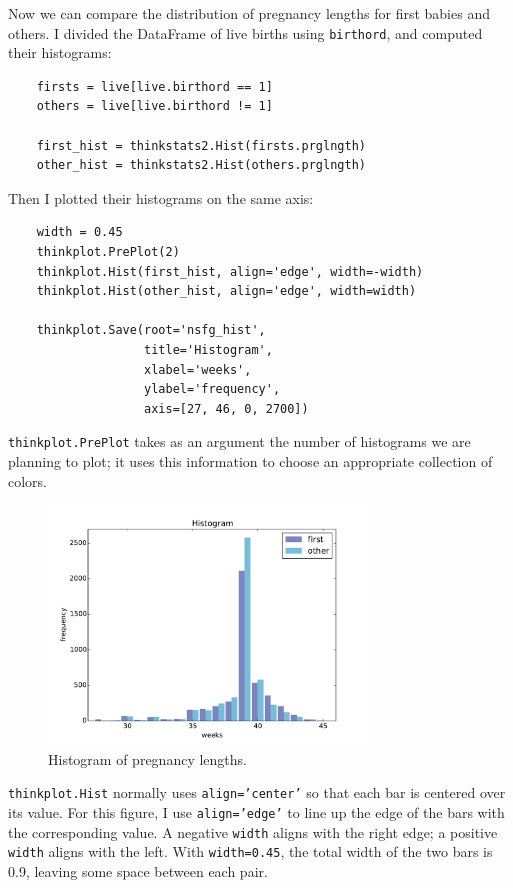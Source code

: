 \documentclass[12pt]{book}
\begin{document}
Now we can compare the distribution of pregnancy lengths for first
babies and others.  I divided the DataFrame of live births using
{\tt birthord}, and computed their histograms:

\begin{verbatim}
    firsts = live[live.birthord == 1]
    others = live[live.birthord != 1]

    first_hist = thinkstats2.Hist(firsts.prglngth)
    other_hist = thinkstats2.Hist(others.prglngth)
\end{verbatim}

Then I plotted their histograms on the same axis:

\begin{verbatim}
    width = 0.45
    thinkplot.PrePlot(2)
    thinkplot.Hist(first_hist, align='edge', width=-width)
    thinkplot.Hist(other_hist, align='edge', width=width)

    thinkplot.Save(root='nsfg_hist', 
                   title='Histogram',
                   xlabel='weeks',
                   ylabel='frequency',
                   axis=[27, 46, 0, 2700])
\end{verbatim}

{\tt thinkplot.PrePlot} takes as an argument the number of histograms
we are planning to plot; it uses this information to choose
an appropriate collection of colors.

\begin{figure}
\centerline{\includegraphics[height=2.5in]{figs/first_nsfg_hist.pdf}}
\caption{Histogram of pregnancy lengths.}
\label{first_nsfg_hist}
\end{figure}

{\tt thinkplot.Hist} normally uses {\tt align='center'} so that
each bar is centered over its value.  For this figure, I use
{\tt align='edge'} to line up the edge of the bars with the
corresponding value.  A negative {\tt width} aligns with
the right edge; a positive {\tt width} aligns with the left.
With {\tt width=0.45}, the total width of the two bars is 0.9,
leaving some space between each pair.
\end{document}

